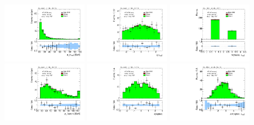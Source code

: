 \clearpage
\begin{figure}[tp]
  \centering
  \includegraphics[width=0.32\textwidth]{figures/analysis/vbf-ZllCR/tau-pt}
  \includegraphics[width=0.32\textwidth]{figures/analysis/vbf-ZllCR/tau-eta}
  \includegraphics[width=0.32\textwidth]{figures/analysis/vbf-ZllCR/tau-numTrack}
  \includegraphics[width=0.32\textwidth]{figures/analysis/vbf-ZllCR/lep-pt-hi}
  \includegraphics[width=0.32\textwidth]{figures/analysis/vbf-ZllCR/lep-eta}
  \includegraphics[width=0.32\textwidth]{figures/analysis/vbf-ZllCR/taulep-dR}

\end{figure}
